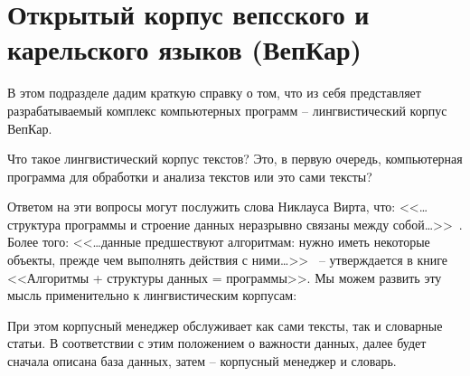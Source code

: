 
\section{Открытый корпус вепсского и карельского языков (ВепКар)} \label{sect_VepKar_about}

В этом подразделе дадим краткую справку о том, что из себя представляет 
разрабатываемый комплекс компьютерных программ -- лингвистический
корпус ВепКар. 


Что такое лингвистический корпус текстов? Это, в первую очередь, компьютерная программа для обработки и анализа текстов или это сами тексты? 

Ответом на эти вопросы могут послужить слова Никлауса Вирта, что: 
<<\ldots структура программы и строение данных неразрывно связаны между собой\ldots>>~\cite[с.~9]{Wirth1989AlgorithmsAndDataStructure}. 
Более того:   
<<\ldots данные предшествуют алгоритмам: нужно иметь некоторые объекты, 
прежде чем выполнять действия с ними\ldots>>~\cite[с.~8]{Wirth1985Algorithms+} 
-- утверждается в книге <<Алгоритмы + структуры данных = программы>>.
Мы можем развить эту мысль применительно к лингвистическим корпусам:
        

\noindent
При этом корпусный менеджер обслуживает как сами тексты, так и словарные статьи. 
В соответствии с этим положением о важности данных, далее будет  
сначала описана база данных, затем -- корпусный менеджер и словарь.
